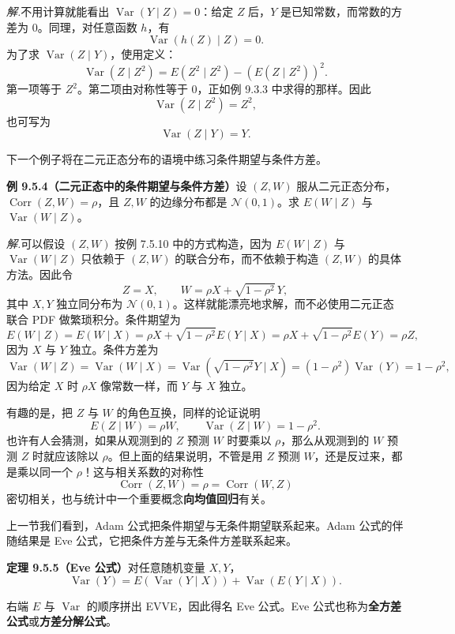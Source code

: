 \documentclass[UTF8,12pt,a4paper,fontset=fandol]{ctexart}
\begin{document}
\noindent\textit{解.}\quad 不用计算就能看出 $\operatorname{Var}(Y\mid Z)=0$：给定 $Z$ 后，$Y$ 是已知常数，而常数的方差为 $0$。同理，对任意函数 $h$，有
\[
  \operatorname{Var}(h(Z)\mid Z)=0.
\]
为了求 $\operatorname{Var}(Z\mid Y)$，使用定义：
\[
  \operatorname{Var}(Z\mid Z^2)=E(Z^2\mid Z^2)-(E(Z\mid Z^2))^2.
\]
第一项等于 $Z^2$。第二项由对称性等于 $0$，正如例 9.3.3 中求得的那样。因此
\[
  \operatorname{Var}(Z\mid Z^2)=Z^2,
\]
也可写为
\[
  \operatorname{Var}(Z\mid Y)=Y.
\]

下一个例子将在二元正态分布的语境中练习条件期望与条件方差。

\noindent\textbf{例 9.5.4（二元正态中的条件期望与条件方差）}\quad 设 $(Z,W)$ 服从二元正态分布，$\operatorname{Corr}(Z,W)=\rho$，且 $Z,W$ 的边缘分布都是 $\mathcal N(0,1)$。求 $E(W\mid Z)$ 与 $\operatorname{Var}(W\mid Z)$。

\noindent\textit{解.}\quad 可以假设 $(Z,W)$ 按例 7.5.10 中的方式构造，因为 $E(W\mid Z)$ 与 $\operatorname{Var}(W\mid Z)$ 只依赖于 $(Z,W)$ 的联合分布，而不依赖于构造 $(Z,W)$ 的具体方法。因此令
\[
  Z=X,\qquad W=\rho X+\sqrt{1-\rho^2}\,Y,
\]
其中 $X,Y$ 独立同分布为 $\mathcal N(0,1)$。这样就能漂亮地求解，而不必使用二元正态联合 PDF 做繁琐积分。条件期望为
\[
  E(W\mid Z)=E(W\mid X)
  =\rho X+\sqrt{1-\rho^2}E(Y\mid X)
  =\rho X+\sqrt{1-\rho^2}E(Y)=\rho Z,
\]
因为 $X$ 与 $Y$ 独立。条件方差为
\[
  \operatorname{Var}(W\mid Z)=\operatorname{Var}(W\mid X)
  =\operatorname{Var}(\sqrt{1-\rho^2}Y\mid X)
  =(1-\rho^2)\operatorname{Var}(Y)=1-\rho^2,
\]
因为给定 $X$ 时 $\rho X$ 像常数一样，而 $Y$ 与 $X$ 独立。

有趣的是，把 $Z$ 与 $W$ 的角色互换，同样的论证说明
\[
  E(Z\mid W)=\rho W,\qquad \operatorname{Var}(Z\mid W)=1-\rho^2.
\]
也许有人会猜测，如果从观测到的 $Z$ 预测 $W$ 时要乘以 $\rho$，那么从观测到的 $W$ 预测 $Z$ 时就应该除以 $\rho$。但上面的结果说明，不管是用 $Z$ 预测 $W$，还是反过来，都是乘以同一个 $\rho$！这与相关系数的对称性
\[
  \operatorname{Corr}(Z,W)=\rho=\operatorname{Corr}(W,Z)
\]
密切相关，也与统计中一个重要概念\textbf{向均值回归}有关。

上一节我们看到，Adam 公式把条件期望与无条件期望联系起来。Adam 公式的伴随结果是 Eve 公式，它把条件方差与无条件方差联系起来。

\noindent\textbf{定理 9.5.5（Eve 公式）}\quad 对任意随机变量 $X,Y$，
\[
  \operatorname{Var}(Y)=E(\operatorname{Var}(Y\mid X))+\operatorname{Var}(E(Y\mid X)).
\]

右端 $E$ 与 $\operatorname{Var}$ 的顺序拼出 EVVE，因此得名 Eve 公式。Eve 公式也称为\textbf{全方差公式}或\textbf{方差分解公式}。
\end{document}

